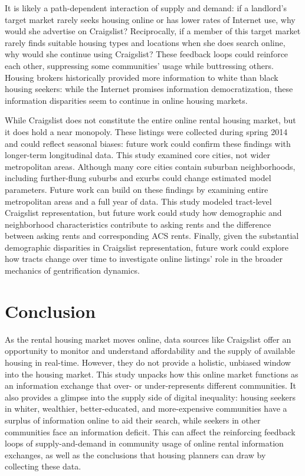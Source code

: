 \documentclass[11pt,onecolumn]{article} %
\begin{document}
It is likely a path-dependent interaction of supply and demand: if a landlord's target market rarely seeks housing online or has lower rates of Internet use, why would she advertise on Craigslist? Reciprocally, if a member of this target market rarely finds suitable housing types and locations when she does search online, why would she continue using Craigslist? These feedback loops could reinforce each other, suppressing some communities' usage while buttressing others. Housing brokers historically provided more information to white than black housing seekers: while the Internet promises information democratization, these information disparities seem to continue in online housing markets.

While Craigslist does not constitute the entire online rental housing market, but it does hold a near monopoly. These listings were collected during spring 2014 and could reflect seasonal biases: future work could confirm these findings with longer-term longitudinal data. This study examined core cities, not wider metropolitan areas. Although many core cities contain suburban neighborhoods, including further-flung suburbs and exurbs could change estimated model parameters. Future work can build on these findings by examining entire metropolitan areas and a full year of data. This study modeled tract-level Craigslist representation, but future work could study how demographic and neighborhood characteristics contribute to asking rents and the difference between asking rents and corresponding ACS rents. Finally, given the substantial demographic disparities in Craigslist representation, future work could explore how tracts change over time to investigate online listings' role in the broader mechanics of gentrification dynamics.

\section{Conclusion}

As the rental housing market moves online, data sources like Craigslist offer an opportunity to monitor and understand affordability and the supply of available housing in real-time. However, they do not provide a holistic, unbiased window into the housing market. This study unpacks how this online market functions as an information exchange that over- or under-represents different communities. It also provides a glimpse into the supply side of digital inequality: housing seekers in whiter, wealthier, better-educated, and more-expensive communities have a surplus of information online to aid their search, while seekers in other communities face an information deficit. This can affect the reinforcing feedback loops of supply-and-demand in community usage of online rental information exchanges, as well as the conclusions that housing planners can draw by collecting these data.
\end{document}
